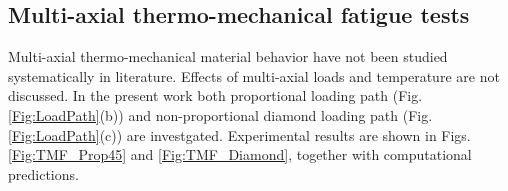 \documentclass[preprint,5p,twocolumn,11pt,sort&compress]{elsarticle}
\begin{document}
\begin{figure*}
\caption{Experimental and computational results under the diamond strain path in-phase thermo-mechanical loading conditions with temperature of 300-650$^{\circ}$C. (a) The first loading cycle. (b) The half life loading cycle. (c) Axial peak-valley stresses as function of the loading cycles. (d) Torsional peak-valley stresses as function of the loading cycles.}
\label{Fig:TMF_Diamond}
\end{figure*}

\subsection{Multi-axial thermo-mechanical fatigue tests}
Multi-axial thermo-mechanical material behavior have not been studied systematically in literature. Effects of multi-axial loads and temperature are not discussed. In the present work both proportional loading path (Fig. \ref{Fig:LoadPath}(b)) and non-proportional diamond loading path (Fig. \ref{Fig:LoadPath}(c)) are investgated. Experimental results are shown in Figs. \ref{Fig:TMF_Prop45} and \ref{Fig:TMF_Diamond}, together with computational predictions.
\end{document}
